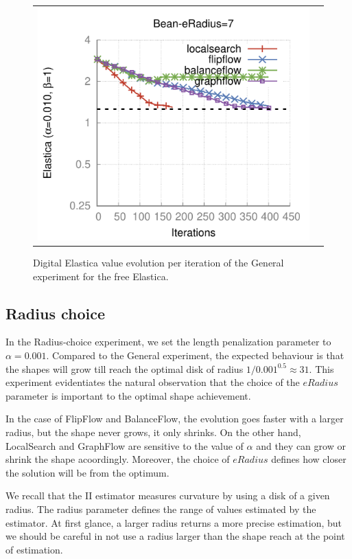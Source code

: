 \begin{figure}
\begin{tabular}{cc}
\includegraphics[scale=0.45]{figures/chapter9/free-elastica/plots/iteration/main_experiment/len_pen_0.01/radius-7/bean.pdf}
\end{tabular}
\caption{Digital Elastica value evolution per iteration of the General experiment for the free Elastica.}
\label{fig:plots-free-elastica-general}
\end{figure}

\subsection{Radius choice}

In the Radius-choice experiment, we set the length penalization parameter to $\alpha=0.001$. Compared to the General experiment, the expected behaviour is that the shapes will grow till reach the optimal disk of radius $1/0.001^{0.5} \approx 31$. This experiment evidentiates the natural observation that the choice of the $eRadius$ parameter is important to the optimal shape achievement.

In the case of FlipFlow and BalanceFlow, the evolution goes faster with a larger radius, but the shape never grows, it only shrinks. On the other hand, LocalSearch and GraphFlow are sensitive to the value of $\alpha$ and they can grow or shrink the shape acoordingly. Moreover, the choice of $eRadius$ defines how closer the solution will be from the optimum.

We recall that the II estimator measures curvature by using a disk of a given radius. The radius parameter defines the range of values estimated by the estimator. At first glance, a larger radius returns a more precise estimation, but we should be careful in not use a radius larger than the shape reach at the point of estimation.

